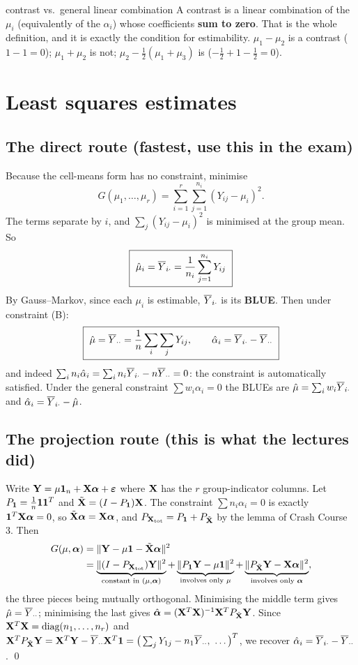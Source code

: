 \documentclass[11pt]{article}
\begin{document}
\begin{confusion}{contrast vs.\ general linear combination}
A contrast is a linear combination of the $\mu_i$ (equivalently of the $\alpha_i$) whose
coefficients \textbf{sum to zero}. That is the whole definition, and it is exactly the
condition for estimability. $\mu_1-\mu_2$ is a contrast ($1-1=0$); $\mu_1+\mu_2$ is not;
$\mu_2-\tfrac12(\mu_1+\mu_3)$ is ($-\tfrac12+1-\tfrac12=0$).
\end{confusion}

\section{Least squares estimates}

\subsection{The direct route (fastest, use this in the exam)}

Because the cell-means form has no constraint, minimise
\[
  G(\mu_1,\dots,\mu_r)=\sum_{i=1}^r\sum_{j=1}^{n_i}(Y_{ij}-\mu_i)^2 .
\]
The terms separate by $i$, and $\sum_j (Y_{ij}-\mu_i)^2$ is minimised at the group mean. So
\[
  \boxed{\ \hat\mu_i=\Ybar_{i\cdot}=\frac1{n_i}\sum_{j=1}^{n_i}Y_{ij}\ }
\]
By Gauss--Markov, since each $\mu_i$ is estimable, $\overline{Y}_{i\cdot}$ is its \textbf{BLUE}.
Then under constraint (B):
\[
  \boxed{\ \hat\mu=\Ybar_{\cdot\cdot}=\frac1n\sum_i\sum_j Y_{ij},
  \qquad \hat\alpha_i=\Ybar_{i\cdot}-\Ybar_{\cdot\cdot}\ }
\]
and indeed $\sum_i n_i\hat\alpha_i=\sum_i n_i\overline{Y}_{i\cdot}-n\overline{Y}_{\cdot\cdot}=0$: the
constraint is automatically satisfied. Under the general constraint $\sum w_i\alpha_i=0$ the
BLUEs are $\hat\mu=\sum_i w_i\overline{Y}_{i\cdot}$ and $\hat\alpha_i=\overline{Y}_{i\cdot}-\hat\mu$.

\subsection{The projection route (this is what the lectures did)}

Write $\mathbf{Y}=\mu\mathbf{1}_n+\mathbf{X}\boldsymbol{\alpha}+\boldsymbol{\varepsilon}$ where $\mathbf{X}$ has the $r$ group-indicator columns. Let
$P_{\mathbf{1}}=\tfrac1n\mathbf{1}\mathbf{1}^T$ and $\tilde{\mathbf{X}}=(I-P_{\mathbf{1}})\mathbf{X}$. The constraint
$\sum n_i\alpha_i=0$ is exactly $\mathbf{1}^T\mathbf{X}\boldsymbol{\alpha}=0$, so $\tilde{\mathbf{X}}\boldsymbol{\alpha}=\mathbf{X}\boldsymbol{\alpha}$, and
$P_{\mathbf{X}_{\text{tot}}}=P_{\mathbf{1}}+P_{\tilde{\mathbf{X}}}$ by the lemma of Crash Course 3. Then
\begin{align*}
  G(\mu,\boldsymbol{\alpha})&=\|\mathbf{Y}-\mu\mathbf{1}-\tilde{\mathbf{X}}\boldsymbol{\alpha}\|^2\\
  &=\underbrace{\|(I-P_{\mathbf{X}_{\text{tot}}})\mathbf{Y}\|^2}_{\text{constant in }(\mu,\boldsymbol{\alpha})}
   +\underbrace{\|P_{\mathbf{1}}\mathbf{Y}-\mu\mathbf{1}\|^2}_{\text{involves only }\mu}
   +\underbrace{\|P_{\tilde{\mathbf{X}}}\mathbf{Y}-\mathbf{X}\boldsymbol{\alpha}\|^2}_{\text{involves only }\boldsymbol{\alpha}},
\end{align*}
the three pieces being mutually orthogonal. Minimising the middle term gives
$\hat\mu=\overline{Y}_{\cdot\cdot}$; minimising the last gives
$\hat{\boldsymbol{\alpha}}=(\mathbf{X}^T\mathbf{X})^{-1}\mathbf{X}^TP_{\tilde{\mathbf{X}}}\mathbf{Y}$. Since
$\mathbf{X}^T\mathbf{X}=\text{diag}(n_1,\dots,n_r)$ and
$\mathbf{X}^TP_{\tilde{\mathbf{X}}}\mathbf{Y}=\mathbf{X}^T\mathbf{Y}-\overline{Y}_{\cdot\cdot}\mathbf{X}^T\mathbf{1}
=\big(\sum_jY_{1j}-n_1\overline{Y}_{\cdot\cdot},\ \dots\big)^T$, we recover
$\hat\alpha_i=\overline{Y}_{i\cdot}-\overline{Y}_{\cdot\cdot}$. \qed
\end{document}
